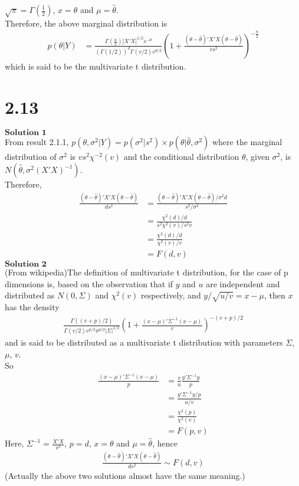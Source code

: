 \documentclass[11pt]{article}
\begin{document}
\(\sqrt{\pi}=\Gamma(\frac{1}{2})\), \(x=\theta\) and
\(\mu=\hat{\theta}\).\\
Therefore, the above marginal distribution is \[\begin{align}
    p(\theta|Y) &= \frac{\Gamma(\frac{n}{2})|X'X|^{1/2}s^{-d}}{(\Gamma(1/2))^d\Gamma(v/2)v^{d/2}}(1+\frac{(\theta-\hat{\theta})'X'X(\theta-\hat{\theta})}{vs^2})^{-\frac{n}{2}}
\end{align}\] which is said to be the multivariate t distribution.

    \hypertarget{section}{%
\section{2.13}\label{section}}

    \(\textbf{Solution 1}\)\\
From result 2.1.1,
\(p(\theta, \sigma^2|Y) = p(\sigma^2|s^2)\times p(\theta|\hat{\theta}, \sigma^2)\)
where the marginal distribution of \(\sigma^2\) is \(vs^2\chi^{-2}(v)\)
and the conditional distribution \(\theta\), given \(\sigma^2\), is
\(N(\hat{\theta}, \sigma^2(X'X)^{-1})\).\\
Therefore, \[\begin{align}
    \frac{(\theta-\hat{\theta})'X'X(\theta-\hat{\theta})}{ds^2} &= \frac{(\theta-\hat{\theta})'X'X(\theta-\hat{\theta})/\sigma^2d}{s^2/\sigma^2} \\
    &= \frac{\chi^2(d)/d}{s^2\chi^2(v)/s^2v} \\
    &= \frac{\chi^2(d)/d}{\chi^2(v)/v} \\
    &= F(d,v)
\end{align}\] \(\textbf{Solution 2}\)\\
(From wikipedia)The definition of multivariate t distribution, for the
case of p dimensions is, based on the observation that if \(y\) and
\(u\) are independent and distributed as \(N(0,\Sigma)\) and
\(\chi^2(v)\) respectively, and \(y/\sqrt{u/v}=x-\mu\), then \(x\) has
the density \[\begin{align}
    \frac{\Gamma((v+p)/2)}{\Gamma(v/2)v^{p/2}\pi^{p/2}|\Sigma|^{1/2}}(1+\frac{(x-\mu)'\Sigma^{-1}(x-\mu)}{v})^{-(v+p)/2}
\end{align}\] and is said to be distributed as a multivariate t
distribution with parameters \(\Sigma\), \(\mu\), \(v\).\\
So \[\begin{align}
    \frac{(x-\mu)'\Sigma^{-1}(x-\mu)}{p}&= \frac{v}{u}\frac{y'\Sigma^{-1}y}{p} \\
    &= \frac{y'\Sigma^{-1}y/p}{u/v} \\
    &= \frac{\chi^2(p)}{\chi^2(v)}\\
    &= F(p,v)
\end{align}\] Here, \(\Sigma^{-1}=\frac{X'X}{s^2}\), \(p=d\),
\(x=\theta\) and \(\mu=\hat{\theta}\), hence \[\begin{align}
    \frac{(\theta-\hat{\theta})'X'X(\theta-\hat{\theta})}{ds^2}\sim F(d,v)
\end{align}\] (Actually the above two solutions almost have the same
meaning.)
\end{document}
